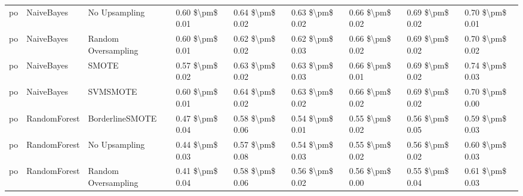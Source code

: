 \begin{tabular}{lllllllll}
      po &                      NaiveBayes &                 No Upsampling &     0.60 \$\textbackslash pm\$ 0.01 &           0.64 \$\textbackslash pm\$ 0.02 &       0.63 \$\textbackslash pm\$ 0.02 &        0.66 \$\textbackslash pm\$ 0.02 &                         0.69 \$\textbackslash pm\$ 0.02 &     0.70 \$\textbackslash pm\$ 0.01 \\
      po &                      NaiveBayes &           Random Oversampling &     0.60 \$\textbackslash pm\$ 0.01 &           0.62 \$\textbackslash pm\$ 0.02 &       0.62 \$\textbackslash pm\$ 0.03 &        0.66 \$\textbackslash pm\$ 0.02 &                         0.69 \$\textbackslash pm\$ 0.02 &     0.70 \$\textbackslash pm\$ 0.02 \\
      po &                      NaiveBayes &                         SMOTE &     0.57 \$\textbackslash pm\$ 0.02 &           0.63 \$\textbackslash pm\$ 0.02 &       0.63 \$\textbackslash pm\$ 0.03 &        0.66 \$\textbackslash pm\$ 0.01 &                         0.69 \$\textbackslash pm\$ 0.02 &     0.74 \$\textbackslash pm\$ 0.03 \\
      po &                      NaiveBayes &                      SVMSMOTE &     0.60 \$\textbackslash pm\$ 0.01 &           0.64 \$\textbackslash pm\$ 0.02 &       0.63 \$\textbackslash pm\$ 0.02 &        0.66 \$\textbackslash pm\$ 0.02 &                         0.69 \$\textbackslash pm\$ 0.02 &     0.70 \$\textbackslash pm\$ 0.00 \\
      po &                    RandomForest &               BorderlineSMOTE &     0.47 \$\textbackslash pm\$ 0.04 &           0.58 \$\textbackslash pm\$ 0.06 &       0.54 \$\textbackslash pm\$ 0.01 &        0.55 \$\textbackslash pm\$ 0.02 &                         0.56 \$\textbackslash pm\$ 0.05 &     0.59 \$\textbackslash pm\$ 0.03 \\
      po &                    RandomForest &                 No Upsampling &     0.44 \$\textbackslash pm\$ 0.03 &           0.57 \$\textbackslash pm\$ 0.08 &       0.54 \$\textbackslash pm\$ 0.03 &        0.55 \$\textbackslash pm\$ 0.02 &                         0.56 \$\textbackslash pm\$ 0.02 &     0.60 \$\textbackslash pm\$ 0.03 \\
      po &                    RandomForest &           Random Oversampling &     0.41 \$\textbackslash pm\$ 0.04 &           0.58 \$\textbackslash pm\$ 0.06 &       0.56 \$\textbackslash pm\$ 0.02 &        0.56 \$\textbackslash pm\$ 0.00 &                         0.55 \$\textbackslash pm\$ 0.04 &     0.61 \$\textbackslash pm\$ 0.03 \\

\end{tabular}
